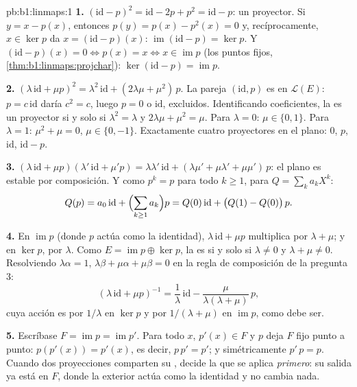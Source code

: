 \begin{solution}{pb:b1:linmaps:1}
\textbf{1.} $(\mathrm{id} - p)^2 = \mathrm{id} - 2p + p^2 =
\mathrm{id} - p$: un proyector. Si $y = x - p(x)$, entonces
$p(y) = p(x) - p^2(x) = 0$ y, recíprocamente, $x \in \ker p$ da
$x = (\mathrm{id} - p)(x)$: $\operatorname{im}(\mathrm{id} - p) =
\ker p$. Y $(\mathrm{id} - p)(x) = 0 \iff p(x) = x \iff x \in
\operatorname{im} p$ (los puntos fijos,
\cref{thm:b1:linmaps:projchar}): $\ker(\mathrm{id} - p) =
\operatorname{im} p$.

\textbf{2.} $(\lambda\,\mathrm{id} + \mu p)^2 =
\lambda^2\,\mathrm{id} + (2\lambda\mu + \mu^2)\,p$. La pareja
$(\mathrm{id}, p)$ es  en $\mathcal{L}(E)$: $p = c\,
\mathrm{id}$ daría $c^2 = c$, luego $p = 0$ o $\mathrm{id}$,
excluidos. Identificando coeficientes, la  es un proyector
si y solo si $\lambda^2 = \lambda$ y $2\lambda\mu + \mu^2 = \mu$.
Para $\lambda = 0$: $\mu \in \{0, 1\}$. Para $\lambda = 1$:
$\mu^2 + \mu = 0$, $\mu \in \{0, -1\}$. Exactamente cuatro
proyectores en el plano: $0$, $p$, $\mathrm{id}$, $\mathrm{id} - p$.

\textbf{3.} $(\lambda\,\mathrm{id} + \mu p)(\lambda'\,\mathrm{id}
+ \mu' p) = \lambda\lambda'\,\mathrm{id} + (\lambda\mu' +
\mu\lambda' + \mu\mu')\,p$: el plano es estable por composición. Y
como $p^k = p$ para todo $k \geq 1$, para $Q = \sum_k a_k X^k$:
\[
Q(p) = a_0\,\mathrm{id} + \Bigl(\sum_{k \geq 1} a_k\Bigr) p
= Q(0)\,\mathrm{id} + \bigl(Q(1) - Q(0)\bigr)\,p .
\]

\textbf{4.} En $\operatorname{im} p$ (donde $p$ actúa como la
identidad), $\lambda\,\mathrm{id} + \mu p$ multiplica por
$\lambda + \mu$; y en $\ker p$, por $\lambda$. Como
$E = \operatorname{im} p \oplus \ker p$, la  es 
si y solo si $\lambda \neq 0$ y $\lambda + \mu \neq 0$. Resolviendo
$\lambda\alpha = 1$, $\lambda\beta + \mu\alpha + \mu\beta = 0$ en la
regla de composición de la pregunta 3:
\[
(\lambda\,\mathrm{id} + \mu p)^{-1}
= \frac1\lambda\,\mathrm{id} -
\frac{\mu}{\lambda(\lambda + \mu)}\,p ,
\]
cuya acción es por $1/\lambda$ en $\ker p$ y por
$1/(\lambda + \mu)$ en $\operatorname{im} p$, como debe ser.

\textbf{5.} Escríbase $F = \operatorname{im} p = \operatorname{im}
p'$. Para todo $x$, $p'(x) \in F$ y $p$ deja $F$ fijo punto a punto:
$p(p'(x)) = p'(x)$, es decir, $p\,p' = p'$; y simétricamente
$p'\,p = p$. Cuando dos proyecciones comparten su , decide la
que se aplica \emph{primero}: su salida ya está en $F$, donde la
 exterior actúa como la identidad y no cambia nada.


\end{solution}
